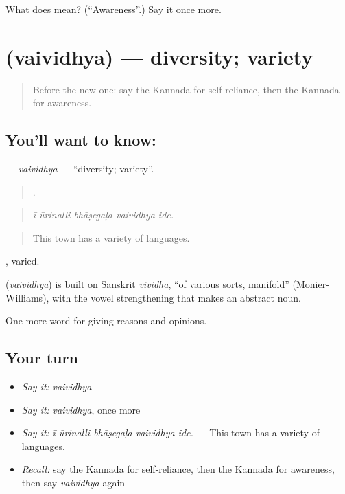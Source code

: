\begin{tcolorbox}[breakable,colback=teal!4,colframe=teal!35!black,title={Before you move on}]
What does  mean? (\textquotedblleft{}Awareness\textquotedblright{}.) Say it once more.
\end{tcolorbox}
\section[\texorpdfstring{\kn{ವೈವಿಧ್ಯ} (vaividhya)}{ವೈವಿಧ್ಯ (vaividhya)}]{ (vaividhya) — diversity; variety}

\label{lesson:KA-C403-vaividhya}



\begin{quote}
Before the new one: say the Kannada for self-reliance, then the Kannada for awareness.
\end{quote}

\subsection*{You'll want to know: }
\textbf{} — \emph{vaividhya} — \textquotedblleft{}diversity; variety\textquotedblright{}.

\begin{quote}
    .
\end{quote}

\begin{quote}
\emph{ī ūrinalli bhāṣegaḷa vaividhya ide.}
\end{quote}

\begin{quote}
This town has a variety of languages.
\end{quote}

, varied.

\begin{cousinweb}
\textbf{} (\emph{vaividhya}) is built on Sanskrit \emph{vividha}, \textquotedblleft{}of various sorts, manifold\textquotedblright{} (Monier-Williams), with the vowel strengthening that makes an abstract noun.
\end{cousinweb}

\begin{grammarlens}[title={What you've built}]
One more word for giving reasons and opinions.
\end{grammarlens}

\subsection*{Your turn}
\begin{itemize}
\raggedright
  \item \emph{Say it:} \emph{vaividhya}
  \item \emph{Say it:} \emph{vaividhya}, once more
  \item \emph{Say it:} \emph{ī ūrinalli bhāṣegaḷa vaividhya ide.} — This town has a variety of languages.
  \item \emph{Recall:} say the Kannada for self-reliance, then the Kannada for awareness, then say \emph{vaividhya} again
\end{itemize}

